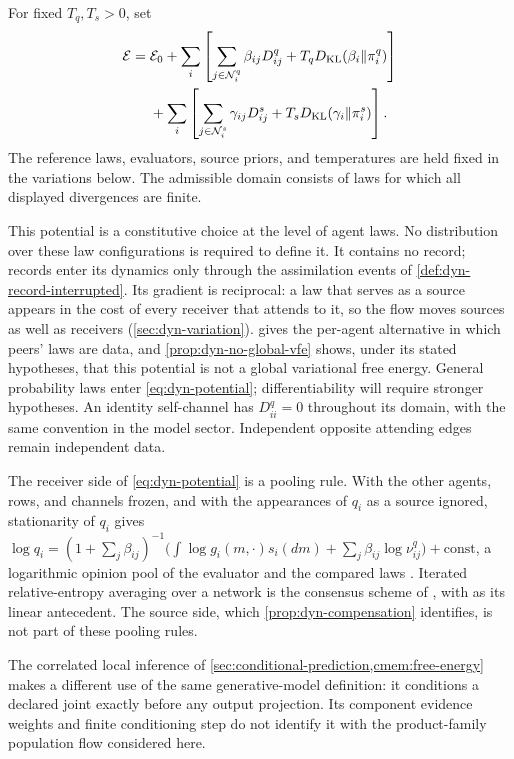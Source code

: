 For fixed $T_q,T_s>0$, set
\begin{equation}
 \begin{aligned}
 \mathcal E={}&\mathcal E_0
 +\sum_i\left[\sum_{j\in\mathcal N_i^q}\beta_{ij}D^q_{ij}
                 +T_qD_{\mathrm{KL}}(\beta_i\Vert\pi_i^q)\right]\\
 &+\sum_i\left[\sum_{j\in\mathcal N_i^s}\gamma_{ij}D^s_{ij}
                 +T_sD_{\mathrm{KL}}(\gamma_i\Vert\pi_i^s)\right].
 \end{aligned}
 \label{eq:dyn-potential}
\end{equation}
The reference laws, evaluators, source priors, and temperatures are held fixed in the variations below. The admissible domain consists of laws for which all displayed divergences are finite.

This potential is a constitutive choice at the level of agent laws. No distribution over these law configurations is required to define it. It contains no record; records enter its dynamics only through the assimilation events of \cref{def:dyn-record-interrupted}. Its gradient is reciprocal: a law that serves as a source appears in the cost of every receiver that attends to it, so the flow moves sources as well as receivers (\cref{sec:dyn-variation}).  gives the per-agent alternative in which peers' laws are data, and \cref{prop:dyn-no-global-vfe} shows, under its stated hypotheses, that this potential is not a global variational free energy. General probability laws enter \cref{eq:dyn-potential}; differentiability will require stronger hypotheses. An identity self-channel has $D^q_{ii}=0$ throughout its domain, with the same convention in the model sector. Independent opposite attending edges remain independent data.

The receiver side of \cref{eq:dyn-potential} is a pooling rule. With the other agents, rows, and channels frozen, and with the appearances of $q_i$ as a source ignored, stationarity of $q_i$ gives $\log q_i=(1+\sum_j\beta_{ij})^{-1}\bigl(\int\log g_i(m,\cdot)s_i(dm)+\sum_j\beta_{ij}\log\nu^q_{ij}\bigr)+\mathrm{const}$, a logarithmic opinion pool of the evaluator and the compared laws \citep{GenestZidek1986,Abbas2009}. Iterated relative-entropy averaging over a network is the consensus scheme of \citet{BattistelliChisci2014}, with \citet{DeGroot1974} as its linear antecedent. The source side, which \cref{prop:dyn-compensation} identifies, is not part of these pooling rules.

The correlated local inference of \cref{sec:conditional-prediction,cmem:free-energy} makes a different use of the same generative-model definition: it conditions a declared joint exactly before any output projection. Its component evidence weights and finite conditioning step do not identify it with the product-family population flow considered here.

